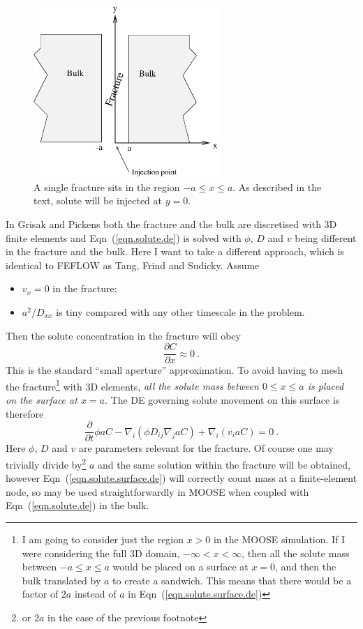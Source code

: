 \documentclass[]{scrreprt}
\begin{document}
\begin{figure}[htb]
\centering
\includegraphics[width=7cm]{single.eps}
\caption{A single fracture sits in the region $-a\leq x \leq a$.  As
  described in the text, solute will be injected at $y=0$.}
\label{single.fig}
\end{figure}

In Grisak and Pickens both the fracture and the
bulk are discretised with 3D finite elements and
Eqn~(\ref{eqn.solute.de}) is solved with $\phi$, $D$ and $v$ being
different in the fracture and the bulk.  Here I want to take a
different approach, which is identical to FEFLOW as Tang, Frind and
Sudicky.  Assume
\begin{itemize}
\item $v_{x} = 0$ in the fracture;
\item $a^{2}/D_{xx}$ is tiny compared with any other timescale in the
  problem.
\end{itemize}
Then the solute concentration in the fracture will obey
\begin{equation}
\frac{\partial C}{\partial x} \approx 0 \ .
\end{equation}
This is the standard ``small aperture'' approximation.  To avoid
having to mesh the fracture\footnote{I am going to
  consider just the region $x>0$ in the MOOSE simulation.  If I were
  considering the full 3D domain, $-\infty < x < \infty$, then all the
  solute mass between $-a\leq x \leq a$ would be placed on a surface
  at $x=0$, and then the bulk translated by $a$ to create a sandwich.
  This means that there would be a factor of $2a$ instead of $a$ in
  Eqn~(\ref{eqn.solute.surface.de})} with 3D elements, {\em all the solute mass
between $0\leq x \leq a$ is placed on the surface at $x=a$}.  The DE
governing solute movement on this surface is therefore
\begin{equation}
\frac{\partial}{\partial t} \phi aC - \nabla_{i}\left(\phi D_{ij}\nabla_{j}aC\right)
+ \nabla_{i}\left(v_{i}aC\right) = 0 \ .
\label{eqn.solute.surface.de}
\end{equation}
Here $\phi$, $D$ and $v$ are parameters relevant for the fracture.
Of course one may trivially divide by\footnote{or $2a$ in the case of
  the previous footnote} $a$ and the same solution within the fracture
will be obtained, however Eqn~(\ref{eqn.solute.surface.de}) will
correctly count mass at a finite-element node, so may be used
straightforwardly in MOOSE when coupled with Eqn~(\ref{eqn.solute.de})
in the bulk.
\end{document}
